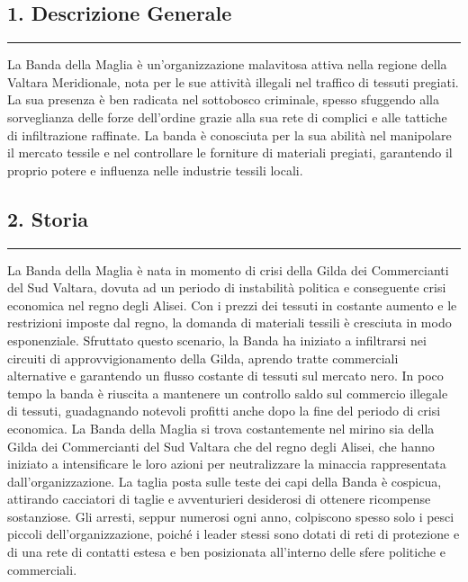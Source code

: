 \subsection{1. Descrizione Generale}\label{descrizione-generale}

\begin{center}\rule{0.5\linewidth}{0.5pt}\end{center}

La Banda della Maglia è un'organizzazione malavitosa attiva nella
regione della Valtara Meridionale, nota per le sue attività illegali nel
traffico di tessuti pregiati. La sua presenza è ben radicata nel
sottobosco criminale, spesso sfuggendo alla sorveglianza delle forze
dell'ordine grazie alla sua rete di complici e alle tattiche di
infiltrazione raffinate. La banda è conosciuta per la sua abilità nel
manipolare il mercato tessile e nel controllare le forniture di
materiali pregiati, garantendo il proprio potere e influenza nelle
industrie tessili locali.

\subsection{2. Storia}\label{storia}

\begin{center}\rule{0.5\linewidth}{0.5pt}\end{center}

La Banda della Maglia è nata in momento di crisi della Gilda dei
Commercianti del Sud Valtara, dovuta ad un periodo di instabilità
politica e conseguente crisi economica nel regno degli Alisei. Con i
prezzi dei tessuti in costante aumento e le restrizioni imposte dal
regno, la domanda di materiali tessili è cresciuta in modo esponenziale.
Sfruttato questo scenario, la Banda ha iniziato a infiltrarsi nei
circuiti di approvvigionamento della Gilda, aprendo tratte commerciali
alternative e garantendo un flusso costante di tessuti sul mercato nero.
In poco tempo la banda è riuscita a mantenere un controllo saldo sul
commercio illegale di tessuti, guadagnando notevoli profitti anche dopo
la fine del periodo di crisi economica. La Banda della Maglia si trova
costantemente nel mirino sia della Gilda dei Commercianti del Sud
Valtara che del regno degli Alisei, che hanno iniziato a intensificare
le loro azioni per neutralizzare la minaccia rappresentata
dall'organizzazione. La taglia posta sulle teste dei capi della Banda è
cospicua, attirando cacciatori di taglie e avventurieri desiderosi di
ottenere ricompense sostanziose. Gli arresti, seppur numerosi ogni anno,
colpiscono spesso solo i pesci piccoli dell'organizzazione, poiché i
leader stessi sono dotati di reti di protezione e di una rete di
contatti estesa e ben posizionata all'interno delle sfere politiche e
commerciali.

